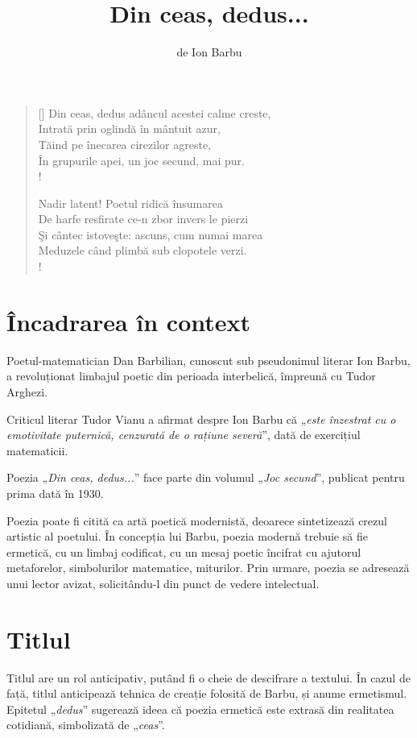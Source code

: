\documentclass{article}
\title{Din ceas, dedus...}
\author{de Ion Barbu}
\date{}
\newcommand{\qu}[1]{„\emph{#1}”}
\begin{document}
\maketitle

\settowidth{\versewidth}{Şi cântec istoveşte: ascuns, cum numai marea}
\begin{verse}[\versewidth]
Din ceas, dedus adâncul acestei calme creste, \\
Intrată prin oglindă în mântuit azur, \\
Tăind pe înecarea cirezilor agreste, \\
În grupurile apei, un joc secund, mai pur. \\!

Nadir latent! Poetul ridică însumarea \\
De harfe resfirate ce-n zbor invers le pierzi \\
Şi cântec istoveşte: ascuns, cum numai marea \\
Meduzele când plimbă sub clopotele verzi. \\!
\end{verse}

\section{Încadrarea în context}
Poetul-matematician Dan Barbilian, cunoscut sub pseudonimul literar Ion Barbu, a revoluționat limbajul poetic din perioada interbelică, împreună cu Tudor Arghezi.

Criticul literar Tudor Vianu a afirmat despre Ion Barbu că \qu{este înzestrat cu o emotivitate puternică, cenzurată de o rațiune severă}, dată de exercițiul matematicii.

Poezia \qu{Din ceas, dedus...} face parte din volumul \qu{Joc secund}, publicat pentru prima dată în 1930.

Poezia poate fi citită ca artă poetică modernistă, deoarece sintetizează crezul artistic al poetului. În concepția lui Barbu, poezia modernă trebuie să fie ermetică, cu un limbaj codificat, cu un mesaj poetic încifrat cu ajutorul metaforelor, simbolurilor matematice, miturilor. Prin urmare, poezia se adresează unui lector avizat, solicitându-l din punct de vedere intelectual.

\section{Titlul}
Titlul are un rol anticipativ, putând fi o cheie de descifrare a textului. În cazul de față, titlul anticipează tehnica de creație folosită de Barbu, și anume ermetismul. Epitetul \qu{dedus} sugerează ideea că poezia ermetică este extrasă din realitatea cotidiană, simbolizată de \qu{ceas}.
\end{document}
